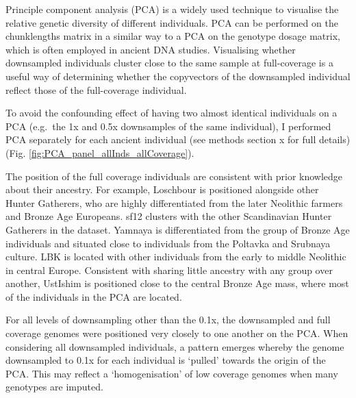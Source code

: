 Principle component analysis (PCA) is a widely used technique to visualise the relative genetic diversity of different individuals. PCA can be performed on the chunklengths matrix in a similar way to a PCA on the genotype dosage matrix, which is often employed in ancient DNA studies. Visualising whether downsampled individuals cluster close to the same sample at full-coverage is a useful way of determining whether the copyvectors of the downsampled individual reflect those of the full-coverage individual.

To avoid the confounding effect of having two almost identical individuals on a PCA (e.g.\ the 1x and 0.5x downsamples of the same individual), I performed PCA separately for each ancient individual (see methods section x for full details) (Fig. \ref{fig:PCA_panel_allInds_allCoverage}). 

The position of the full coverage individuals are consistent with prior knowledge about their ancestry. For example, Loschbour is positioned alongside other Hunter Gatherers, who are highly differentiated from the later Neolithic farmers and Bronze Age Europeans. sf12 clusters with the other Scandinavian Hunter Gatherers in the dataset. Yamnaya is differentiated from the group of Bronze Age individuals and situated close to individuals from the Poltavka and Srubnaya culture. LBK is located with other individuals from the early to middle Neolithic in central Europe. Consistent with sharing little ancestry with any group over another, UstIshim is positioned close to the central Bronze Age mass, where most of the individuals in the PCA are located. 

For all levels of downsampling other than the 0.1x, the downsampled and full coverage genomes were positioned very closely to one another on the PCA. When considering all downsampled individuals, a pattern emerges whereby the genome downsampled to 0.1x for each individual is `pulled' towards the origin of the PCA. This may reflect a `homogenisation' of low coverage genomes when many genotypes are imputed.

